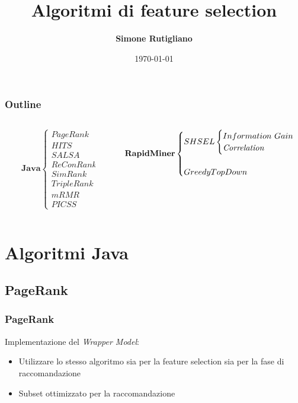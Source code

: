 \documentclass{beamer}
\title[Algoritmi]{Algoritmi di feature selection}
\institute{
\begin{small}
Corso di Laurea in Informatica Magistrale
\end{small}}
\author{\textbf{Simone Rutigliano}}
\date{\tiny{\today}}
\begin{document}

\begin{frame}
\maketitle
\end{frame}


\begin{frame}
\frametitle{Outline}
	\begin{columns}
		\begin{column}{0.4\textwidth}
			\begin{equation*}
			\qquad \textbf{Java}
			\begin{cases} 
			PageRank
			\\ 
			HITS
			\\
			SALSA
			\\
			ReConRank
			\\
			SimRank
			\\
			TripleRank
			\\
			mRMR
			\\
			PICSS
			\end{cases}
			\end{equation*}
		\end{column}
		\begin{column}{0.8\textwidth}
			\begin{equation*}
			\qquad \textbf{RapidMiner}
			\begin{cases} 
			SHSEL \begin{cases} 
			Information ~Gain \\ \mbox{\emph{Correlation}}
			\end{cases}
			\\~\\
			Greedy Top Down
			\end{cases}
			\end{equation*}
		\end{column}
	\end{columns}
\end{frame}

\section{Algoritmi Java}
\subsection{PageRank}
\begin{frame}
	\frametitle{PageRank}
	Implementazione del \emph{Wrapper Model}: 
	\begin{itemize}
		\item Utilizzare lo stesso algoritmo sia per la feature selection sia per la fase di raccomandazione
		\item Subset ottimizzato per la raccomandazione
	\end{itemize}
\end{frame}
\end{document}
